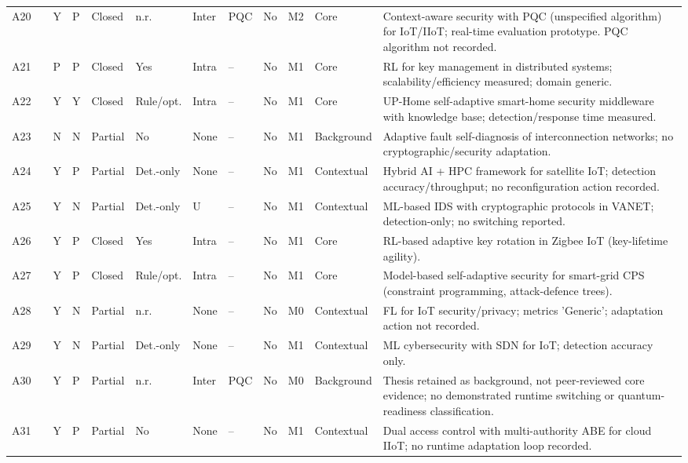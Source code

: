 {\begin{longtable}{p{0.43cm}p{0.8cm}p{0.3cm}p{0.4cm}p{0.8cm}p{0.75cm}p{0.65cm}p{0.8cm}p{0.8cm}p{0.45cm}p{1.1cm}p{4.95cm}}
A20 & \cite{10894874} & Y & P & Closed & n.r. & Inter & PQC & No & M2 & Core & Context-aware security with PQC (unspecified algorithm) for IoT/IIoT; real-time evaluation prototype. PQC algorithm not recorded. \\
A21 & \cite{10812245} & P & P & Closed & Yes & Intra & -- & No & M1 & Core & RL for key management in distributed systems; scalability/efficiency measured; domain generic. \\
A22 & \cite{Silva2024} & Y & Y & Closed & Rule/opt. & Intra & -- & No & M1 & Core & UP-Home self-adaptive smart-home security middleware with knowledge base; detection/response time measured. \\
A23 & \cite{10420514} & N & N & Partial & No & None & -- & No & M1 & Background & Adaptive fault self-diagnosis of interconnection networks; no cryptographic/security adaptation. \\
A24 & \cite{Ahmad2024} & Y & P & Partial & Det.-only & None & -- & No & M1 & Contextual & Hybrid AI + HPC framework for satellite IoT; detection accuracy/throughput; no reconfiguration action recorded. \\
A25 & \cite{Venkatasamy2024} & Y & N & Partial & Det.-only & U & -- & No & M1 & Contextual & ML-based IDS with cryptographic protocols in VANET; detection-only; no switching reported. \\
A26 & \cite{Fang2024} & Y & P & Closed & Yes & Intra & -- & No & M1 & Core & RL-based adaptive key rotation in Zigbee IoT (key-lifetime agility). \\
A27 & \cite{Chehida2024} & Y & P & Closed & Rule/opt. & Intra & -- & No & M1 & Core & Model-based self-adaptive security for smart-grid CPS (constraint programming, attack-defence trees). \\
A28 & \cite{10468686} & Y & N & Partial & n.r. & None & -- & No & M0 & Contextual & FL for IoT security/privacy; metrics 'Generic'; adaptation action not recorded. \\
A29 & \cite{10837268} & Y & N & Partial & Det.-only & None & -- & No & M1 & Contextual & ML cybersecurity with SDN for IoT; detection accuracy only. \\
A30 & \cite{Khan2024Thesis} & Y & P & Partial & n.r. & Inter & PQC & No & M0 & Background & Thesis retained as background, not peer-reviewed core evidence; no demonstrated runtime switching or quantum-readiness classification. \\
A31 & \cite{10908619} & Y & P & Partial & No & None & -- & No & M1 & Contextual & Dual access control with multi-authority ABE for cloud IIoT; no runtime adaptation loop recorded. \\

\end{longtable}}
